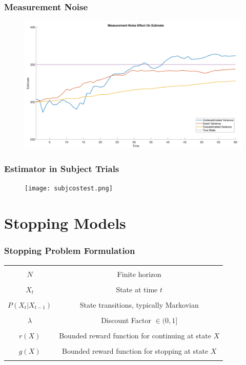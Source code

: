 \documentclass[compress, xcolor=pst]{beamer}
\begin{document}
\begin{frame}
	\frametitle{\textbf{Measurement Noise}}
	\begin{figure}
	\centering
	\includegraphics[width=\textwidth]{measurementnoise.png}
	\end{figure}
\end{frame}

\begin{frame}
	\frametitle{\textbf{Estimator in Subject Trials}}
	\begin{figure}[t]
	\centering
	\texttt{[image: subjcostest.png]}
	\end{figure}
\end{frame}

\section{Stopping Models}
\begin{frame}
	\frametitle{\textbf{Stopping Problem Formulation}}
	\begin{table}
		\centering
		\begin{tabular}{ |c  c| }
		  \hline&\\
		  $N$ & Finite horizon\\
		  &\\
		  $X_t$ & State at time $t$\\
		  &\\
		  $P(X_t \vert X_{t-1})$ & State transitions, typically Markovian\\
		  &\\
		  $\lambda$ & Discount Factor $\in (0, 1]$\\
		  &\\
		  $r(X)$ & Bounded reward function for continuing at state $X$\\
		  &\\
		  $g(X)$ & Bounded reward function for stopping at state $X$\\
		  &\\
		  \hline
		\end{tabular}
		\end{table}
\end{frame}
\end{document}
